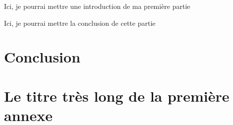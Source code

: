 \documentclass[12pt,twoside]{book}
\begin{document}
	Ici, je pourrai mettre une introduction de ma première partie
	
	
	
	
	
	Ici, je pourrai mettre la conclusion de cette partie
	
	
	\chapter*{Conclusion}
\newpage{\pagestyle{empty}\cleardoublepage}
	







\appendix %

\chapter[Titre court]{Le titre très long de la première annexe}

%

\newpage{\pagestyle{empty}\cleardoublepage}


\backmatter %


\printglossaries
\tableofcontents
\end{document}
